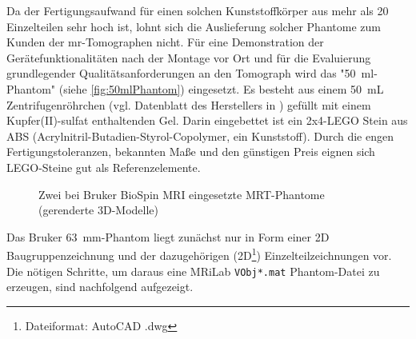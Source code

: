  Da der Fertigungsaufwand für einen solchen Kunststoffkörper aus mehr als 20 Einzelteilen sehr hoch ist, lohnt sich die Auslieferung solcher Phantome zum Kunden der \gls{mr}-Tomographen nicht. Für eine Demonstration der Gerätefunktionalitäten nach der Montage vor Ort und für die Evaluierung grundlegender Qualitätsanforderungen an den Tomograph wird das "50~ml-Phantom" (siehe \autoref{fig:50mlPhantom}) eingesetzt. Es besteht aus einem \SI{50}{\milli\liter} Zentrifugenröhrchen (vgl. Datenblatt des Herstellers in \cite{corningCentriStar}) gefüllt mit einem Kupfer(II)-sulfat enthaltenden Gel. Darin eingebettet ist ein 2x4-LEGO Stein aus ABS (Acrylnitril-Butadien-Styrol-Copolymer, ein Kunststoff). Durch die engen Fertigungstoleranzen, bekannten Maße und den günstigen Preis eignen sich LEGO-Steine gut als Referenzelemente.

\begin{figure}[H]
	\centering
	\hfill
	\caption[Bruker Phantome]{Zwei bei Bruker BioSpin MRI eingesetzte MRT-Phantome (gerenderte 3D-Modelle)}
\end{figure}

Das Bruker 63~mm-Phantom liegt zunächst nur in Form einer 2D Baugruppenzeichnung und der dazugehörigen (2D\footnote{Dateiformat: AutoCAD .dwg}) Einzelteilzeichnungen vor. Die nötigen Schritte, um daraus eine MRiLab \texttt{VObj*.mat} Phantom-Datei zu erzeugen, sind nachfolgend aufgezeigt.

